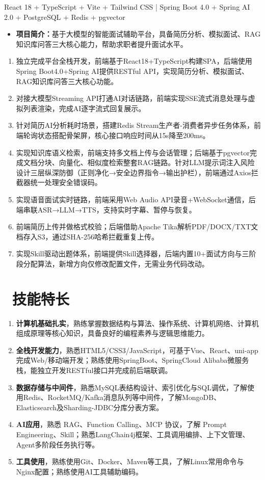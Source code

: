 ﻿\documentclass[10pt,a4paper]{ctexart}
\newcommand{\sect}[2]{%
  \section{\texorpdfstring{\makebox[\widthof{\faGraduationCap}][c]{{\mdseries\color{themecolor}#1}}\ #2}{#2}}
}
\begin{document}
React 18 + TypeScript + Vite + Tailwind CSS \quad | \quad Spring Boot 4.0 + Spring AI 2.0 + PostgreSQL + Redis + pgvector
\begin{itemize}
  \item \textbf{项目简介：}基于大模型的智能面试辅助平台，具备简历分析、模拟面试、RAG知识库问答三大核心能力，帮助求职者提升面试水平。
\end{itemize}
\begin{enumerate}
  \item 独立完成平台全栈开发，前端基于React18+TypeScript构建SPA，后端使用Spring Boot4.0+Spring AI提供RESTful API，实现简历分析、模拟面试、RAG知识库问答三大核心功能。
  \item 对接大模型Streaming API打通AI对话链路，前端实现SSE流式消息处理与虚拟列表渲染，完成AI逐字流式回复展示。
  \item 针对简历AI分析耗时场景，搭建Redis Stream生产者-消费者异步任务体系，前端轮询状态搭配骨架屏，核心接口响应时间\textcolor{themecolor}{从15s降至200ms}。
  \item 实现知识库语义检索，前端支持多文档上传与会话管理；后端基于pgvector完成文档分块、向量化、相似度检索整套RAG链路。针对LLM提示词注入风险设计三层纵深防御（正则净化→安全边界指令→输出护栏），前端通过Axios拦截器统一处理安全错误码。
  \item 实现语音面试实时链路，前端采用Web Audio API录音+WebSocket通信，后端串联ASR→LLM→TTS，支持实时字幕、暂停与恢复。
  \item 前端简历上传并做格式校验；后端借助Apache Tika解析PDF/DOCX/TXT文档存入S3，通过SHA-256哈希拦截重复上传。
  \item 实现Skill驱动出题体系，前端提供Skill选择器，后端内置10+面试方向与三阶段分配算法，新增方向仅修改配置文件，无需业务代码改动。
\end{enumerate}



\sect{\faWrench}{技能特长}
\begin{enumerate}
  \item \textbf{计算机基础扎实}，熟练掌握数据结构与算法、操作系统、计算机网络、计算机组成原理等核心知识，具备良好的编程素养与逻辑思维能力。
  \item \textbf{全栈开发能力}，熟悉HTML5/CSS3/JavaScript，可基于Vue、React、uni-app完成Web/移动端开发；熟练使用SpringBoot、SpringCloud Alibaba微服务栈，能独立开发RESTful接口并完成前后端联调。
  \item \textbf{数据存储与中间件}，熟悉MySQL表结构设计、索引优化与SQL调优，了解使用Redis、RocketMQ/Kafka消息队列等中间件，了解MongoDB、Elasticsearch及Sharding-JDBC分库分表方案。
  \item \textbf{AI应用}，熟悉 RAG、Function Calling、MCP 协议，了解 Prompt Engineering、Skill；熟悉LangChain4j框架、工具调用编排、上下文管理、Agent多阶段任务执行等。
  \item \textbf{工具使用}，熟练使用Git、Docker、Maven等工具，了解Linux常用命令与Nginx配置；熟练使用AI工具辅助编码。
\end{enumerate}
\end{document}
